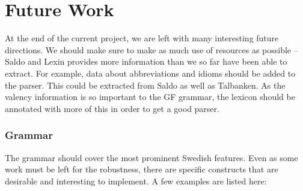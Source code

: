 \documentclass[runningheads,a4paper]{llncs}
\begin{document}
%



\section{Future Work}

At the end of the current project, we are left with 
many interesting future directions. 
We should make sure to make as much use of resources as possible -- Saldo
and Lexin provides more information than we so far have been able to extract.
For example, data about abbreviations and idioms should
be added to the parser. This could be extracted from Saldo as well as Talbanken.
As the valency information is so important to the GF grammar, the lexicon should
be annotated with more of this in order to get a good parser.

 
\subsubsection{Grammar}
The grammar should cover the most prominent Swedish features.
Even as some work must be left for the robustness, there are specific constructs
that are desirable and interesting to implement. A few examples are listed here:\\
\end{document}
